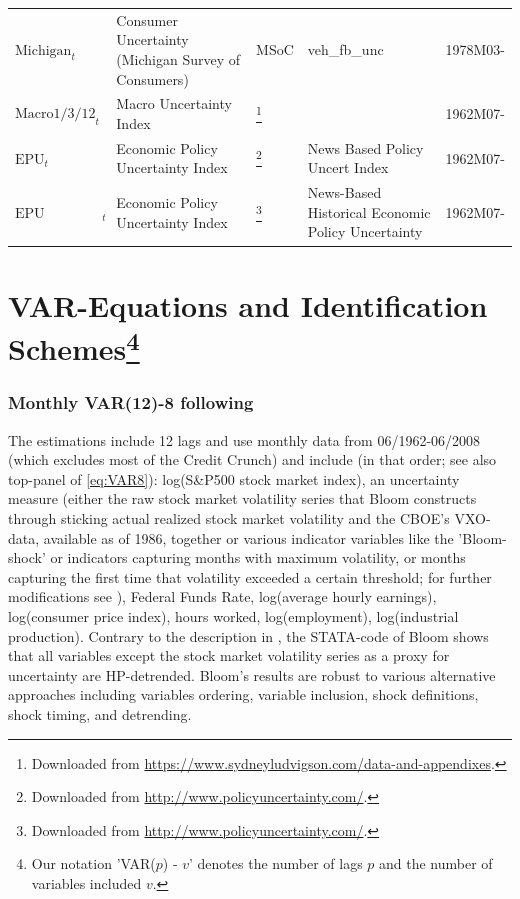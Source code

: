 \documentclass[a4paper,11pt,listof=nochaptergap,oneside,pointednumbers,bibtotoc,bigheadings,liststotoc,hidelinks]{scrbook}
\theoremstyle{mysatz}
\theoremstyle{mydefinition}
\theoremstyle{mytheorem}
\theoremstyle{mybemerkung}
\begin{document}
\begin{table}[!h]
{\begin{tabular}{L{2.7cm}p{5.4cm}p{2.5cm}p{3.4cm}L{2.5cm}}
         $\text{Michigan}_t$ & Consumer Uncertainty (Michigan Survey of Consumers) & MSoC & veh_fb_unc & 1978M03- \\
 	$\text{Macro1/3/12}_t$ & Macro Uncertainty Index & \citet{juradoetal:15}\footnote{Downloaded from \url{https://www.sydneyludvigson.com/data-and-appendixes}.} &  & 1962M07- \\
	$\text{EPU}_t$ & Economic Policy Uncertainty Index & \citet{bakeretal:15}\footnote{Downloaded from \url{http://www.policyuncertainty.com/}.} & News Based Policy Uncert Index & 1962M07- \\
	$\text{EPU Historical}_t$ & Economic Policy Uncertainty Index & \citet{bakeretal:15}\footnote{Downloaded from \url{http://www.policyuncertainty.com/}.} & News-Based Historical Economic Policy Uncertainty & 1962M07- \\
        \bottomrule
\end{tabular}
}
\label{tab:data_sources} %
\end{table}


\section[VAR-Equations and Identification Schemes]{VAR-Equations and Identification Schemes\footnote{Our notation 'VAR($p$) - $v$' denotes the number of lags $p$ and the number of variables included $v$.}}
\label{sec:VAREquations}
\subsubsection{Monthly VAR(12)-8 following \citet{bloom:09}}
The estimations include 12 lags and use monthly data from 06/1962-06/2008 (which excludes most of the Credit Crunch) and include (in that order; see also top-panel of \ref{eq:VAR8}): log(S\&P500 stock market index), an uncertainty measure (either the raw stock market volatility series that Bloom constructs through sticking actual realized stock market volatility and the CBOE's VXO-data, available as of 1986, together or various indicator variables like the 'Bloom-shock' or indicators capturing months with maximum volatility, or months capturing the first time that volatility exceeded a certain threshold; for further modifications see \citealp{bloom:09}), Federal Funds Rate, log(average hourly earnings), log(consumer price index), hours worked, log(employment), log(industrial production). Contrary to the description in \citet{bloom:09}, the STATA-code of Bloom shows that all variables except the stock market volatility series as a proxy for uncertainty are HP-detrended. Bloom's results are robust to various alternative approaches including variables ordering, variable inclusion, shock definitions, shock timing, and detrending.\\
\end{document}
